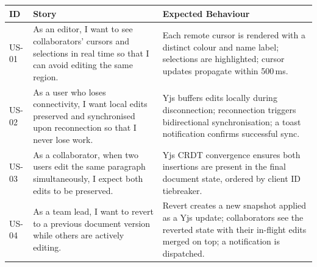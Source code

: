 \documentclass{article}
\begin{document}
\noindent
{\small
\begin{tabularx}{\textwidth}{|>{\hsize=0.3\hsize\raggedright\arraybackslash}X|>{\hsize=1.2\hsize\raggedright\arraybackslash}X|>{\hsize=1.5\hsize\raggedright\arraybackslash}X|}
    \hline
    \rowcolor{tableBlue} 
    \textbf{\color{white}ID} & 
    \textbf{\color{white}Story} & 
    \textbf{\color{white}Expected Behaviour} \\
    \hline
    US-01 &
    As an editor, I want to see collaborators' cursors and selections in real time so that I can avoid editing the same region. &
    Each remote cursor is rendered with a distinct colour and name label; selections are highlighted; cursor updates propagate within 500\,ms. \\
    \hline
    US-02 &
    As a user who loses connectivity, I want local edits preserved and synchronised upon reconnection so that I never lose work. &
    Yjs buffers edits locally during disconnection; reconnection triggers bidirectional synchronisation; a toast notification confirms successful sync. \\
    \hline
    US-03 &
    As a collaborator, when two users edit the same paragraph simultaneously, I expect both edits to be preserved. &
    Yjs CRDT convergence ensures both insertions are present in the final document state, ordered by client ID tiebreaker. \\
    \hline
    US-04 &
    As a team lead, I want to revert to a previous document version while others are actively editing. &
    Revert creates a new snapshot applied as a Yjs update; collaborators see the reverted state with their in-flight edits merged on top; a notification is dispatched. \\
    \hline
    \end{tabularx}
}
\end{document}
